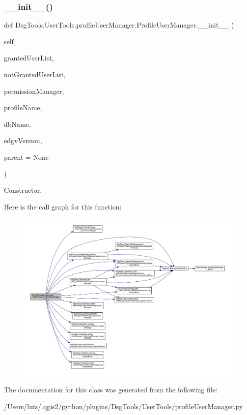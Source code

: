 \subsubsection{\texorpdfstring{\+\_\+\+\_\+init\+\_\+\+\_\+()}{\_\_init\_\_()}}
{\footnotesize\ttfamily def Dsg\+Tools.\+User\+Tools.\+profile\+User\+Manager.\+Profile\+User\+Manager.\+\_\+\+\_\+init\+\_\+\+\_\+ (\begin{DoxyParamCaption}\item[{}]{self,  }\item[{}]{granted\+User\+List,  }\item[{}]{not\+Granted\+User\+List,  }\item[{}]{permission\+Manager,  }\item[{}]{profile\+Name,  }\item[{}]{db\+Name,  }\item[{}]{edgv\+Version,  }\item[{}]{parent = {\ttfamily None} }\end{DoxyParamCaption})}

\begin{DoxyVerb}Constructor.\end{DoxyVerb}
 Here is the call graph for this function\+:
\nopagebreak
\begin{figure}[H]
\begin{center}
\leavevmode
\includegraphics[width=350pt]{class_dsg_tools_1_1_user_tools_1_1profile_user_manager_1_1_profile_user_manager_a6712af6b0351580186fd3aeb200273ab_cgraph}
\end{center}
\end{figure}


The documentation for this class was generated from the following file\+:\begin{DoxyCompactItemize}
\item 
/\+Users/luiz/.\+qgis2/python/plugins/\+Dsg\+Tools/\+User\+Tools/profile\+User\+Manager.\+py\end{DoxyCompactItemize}
